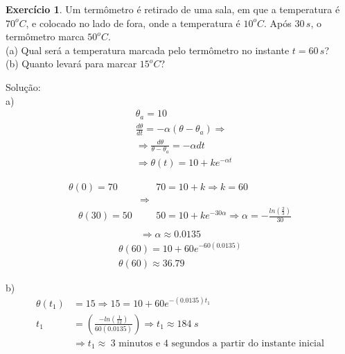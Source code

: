 \documentclass[a4paper,12pt,reqno,natbib]{amsart}
\theoremstyle{definition}
\newtheorem{exercise}{Exerc\'icio}
\begin{document}
\begin{center}
\end{center}

\vspace{0.7 cm}

\begin{exercise}
Um termômetro é retirado de uma sala, em que a temperatura é $70^{o}C$, e colocado no lado de fora, onde a temperatura é $10^{o}C$. Após $30\,s$, o termômetro marca $50^{o}C$. \\ 
(a) Qual será a temperatura marcada pelo termômetro no instante $t = 60\,s$? \\
(b) Quanto levará para marcar $15^{o}C$?
\end{exercise}
Solu\c c\~ao:\\
a) 
\begin{align*}
	&\theta_a = 10\\
	&\frac{d\theta}{dt} = -\alpha(\theta - {\theta_a}) \Rightarrow\\
	&\Rightarrow \frac{d\theta}{\theta - {\theta_a}} = -\alpha dt\\
	&\Rightarrow  \theta(t) = 10 + ke^{-\alpha t}
\end{align*}

{
	\setlength{\jot}{-8pt}
\begin{align*}
	\theta (0) = 70& \hspace{20pt} 70 = 10 + k \Rightarrow k = 60\\
	&\Rightarrow\\\hspace{12pt}  
	\theta (30) = 50& \hspace{20pt} 50 = 10 + ke^{-30\alpha} \Rightarrow \alpha = -\frac{ln (\frac{2}{3})}{30}\\\\
	&\Rightarrow \alpha \approx 0.0135
 \end{align*}
}
\begin{align*}
	\theta(60) = 10 + 60e^{-60(0.0135)}\\
	\theta(60) \approx 36.79
\end{align*}

b)\\
\begin{align*}
	\theta (t_1) &= 15 \Rightarrow 15 = 10 + 60e^{-(0.0135)t_1}\\
	t_1 &= (\frac{-ln(\frac{1}{12})}{60(0.0135)}) \Rightarrow t_1 \approx 184 \hspace{3pt}s \\
	&\Rightarrow \boxed{t_1 \approx \hspace{3pt} \mbox{3 minutos e 4 segundos a partir do instante inicial}}
\end{align*}
\vspace{0.6 cm}
\end{document}
